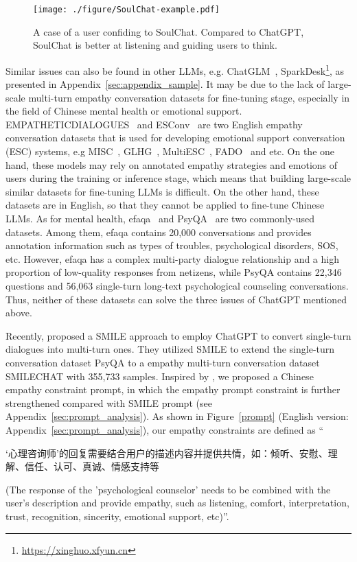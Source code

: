 \documentclass[11pt]{article}
\begin{document}
\begin{figure*}[ht]
  \centering
  \texttt{[image: ./figure/SoulChat-example.pdf]}
  \caption{A case of a user confiding to SoulChat. Compared to ChatGPT, SoulChat is better at listening and guiding users to think.
}
  \label{SoulChat_Example}
\end{figure*}

Similar issues can also be found in other LLMs, e.g. ChatGLM~\citep{zeng2023glm-130b}, SparkDesk\footnote{\url{https://xinghuo.xfyun.cn}}, as presented in Appendix~\ref{sec:appendix_sample}. It may be due to the lack of large-scale multi-turn empathy conversation datasets for fine-tuning stage, especially in the field of Chinese mental health or emotional support. EMPATHETICDIALOGUES~\citep{rashkin-etal-2019-towards} and ESConv~\citep{liu-etal-2021-towards} are two English empathy conversation datasets that is used for developing emotional support conversation (ESC) systems, e.g MISC~\citep{tu-etal-2022-misc}, GLHG~\citep{peng2022control}, MultiESC~\citep{cheng-etal-2022-improving}, FADO~\citep{PENG2023110340} and etc. On the one hand, these models may rely on annotated empathy strategies and emotions of users during the training or inference stage, which means that building large-scale similar datasets for fine-tuning LLMs is difficult. On the other hand, these datasets are in English, so that they cannot be applied to fine-tune Chinese LLMs. As for mental health, efaqa~\citep{efaqa-corpus-zh:petpsychology} and PsyQA~\citep{sun-etal-2021-psyqa} are two commonly-used datasets. Among them, efaqa contains 20,000 conversations and provides annotation information such as types of troubles, psychological disorders, SOS, etc. However, efaqa has a complex multi-party dialogue relationship and a high proportion of low-quality responses from netizens, while PsyQA contains 22,346 questions and 56,063 single-turn long-text psychological counseling conversations. Thus, neither of these datasets can solve the three issues of ChatGPT mentioned above. 

Recently, \citet{qiu2023smile} proposed a SMILE approach to employ ChatGPT to convert single-turn dialogues into multi-turn ones. They utilized SMILE to extend the single-turn conversation dataset PsyQA to a empathy multi-turn conversation dataset SMILECHAT with 355,733 samples. Inspired by \citep{qiu2023smile}, we proposed a Chinese empathy constraint prompt, in which the empathy prompt constraint is further strengthened compared with SMILE prompt (see Appendix~\ref{sec:prompt_analysis}). As shown in Figure~\ref{prompt} (English version: Appendix~\ref{sec:prompt_analysis}), our empathy constraints are defined as ``\begin{CJK}{UTF8}{gbsn}`心理咨询师'的回复需要结合用户的描述内容并提供共情，如：倾听、安慰、理解、信任、认可、真诚、情感支持等\end{CJK} (The response of the 'psychological counselor' needs to be combined with the user's description and provide empathy, such as listening, comfort, interpretation, trust, recognition, sincerity, emotional support, etc)''.
\end{document}
